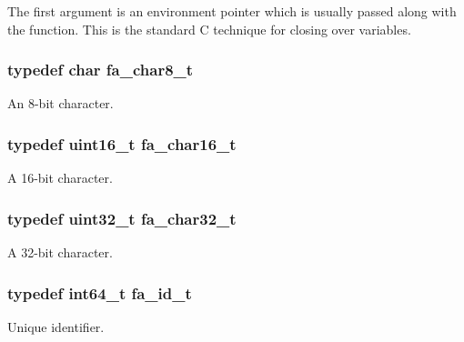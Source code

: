 The first argument is an environment pointer which is usually passed along with the function. This is the standard C technique for closing over variables. \hypertarget{group___fa_ga98bfdb5d0438f95f3438cddeab1818e8}{
\subsubsection[{fa\-\_\-char8\-\_\-t}]{\setlength{\rightskip}{0pt plus 5cm}typedef char {\bf fa\-\_\-char8\-\_\-t}}}\label{group___fa_ga98bfdb5d0438f95f3438cddeab1818e8}


An 8-\/bit character. 

\hypertarget{group___fa_ga33e83372a0abc1895fdad5fb4d15eae3}{
\subsubsection[{fa\-\_\-char16\-\_\-t}]{\setlength{\rightskip}{0pt plus 5cm}typedef uint16\-\_\-t {\bf fa\-\_\-char16\-\_\-t}}}\label{group___fa_ga33e83372a0abc1895fdad5fb4d15eae3}


A 16-\/bit character. 

\hypertarget{group___fa_gaca70e02afbba75b08b2b6531b821f67b}{
\subsubsection[{fa\-\_\-char32\-\_\-t}]{\setlength{\rightskip}{0pt plus 5cm}typedef uint32\-\_\-t {\bf fa\-\_\-char32\-\_\-t}}}\label{group___fa_gaca70e02afbba75b08b2b6531b821f67b}


A 32-\/bit character. 

\hypertarget{group___fa_gaeb5011c69dfea4d2c41c05a2c95899d0}{
\subsubsection[{fa\-\_\-id\-\_\-t}]{\setlength{\rightskip}{0pt plus 5cm}typedef int64\-\_\-t {\bf fa\-\_\-id\-\_\-t}}}\label{group___fa_gaeb5011c69dfea4d2c41c05a2c95899d0}


Unique identifier. 

